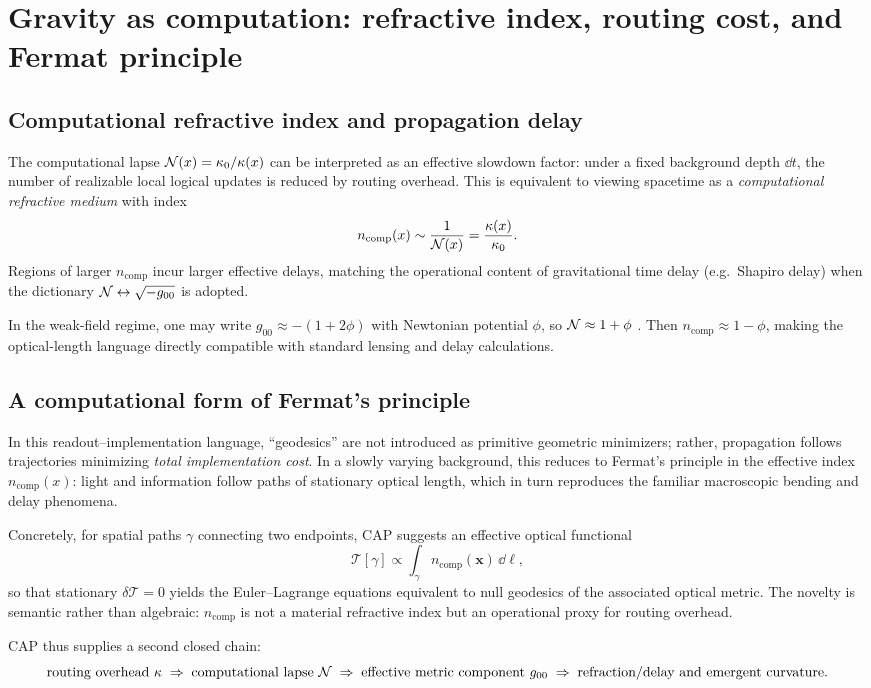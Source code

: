 \section{Gravity as computation: refractive index, routing cost, and Fermat principle}
\label{sec:gravity_as_computation}

\subsection{Computational refractive index and propagation delay}
\label{subsec:comp_index}

The computational lapse $\mathcal{N}(x)=\kappa_0/\kappa(x)$ can be interpreted as an effective slowdown factor: under a fixed background depth $\dd t$, the number of realizable local logical updates is reduced by routing overhead. This is equivalent to viewing spacetime as a \emph{computational refractive medium} with index
\begin{equation}
  n_{\mathrm{comp}}(x) \sim \frac{1}{\mathcal{N}(x)} = \frac{\kappa(x)}{\kappa_0}.
\end{equation}
Regions of larger $n_{\mathrm{comp}}$ incur larger effective delays, matching the operational content of gravitational time delay (e.g.\ Shapiro delay) when the dictionary $\mathcal{N}\leftrightarrow\sqrt{-g_{00}}$ is adopted.

In the weak-field regime, one may write $g_{00}\approx -(1+2\phi)$ with Newtonian potential $\phi$, so $\mathcal{N}\approx 1+\phi$ \cite{Carroll2004,Wald1984}. Then $n_{\mathrm{comp}}\approx 1-\phi$, making the optical-length language directly compatible with standard lensing and delay calculations.

\subsection{A computational form of Fermat's principle}
\label{subsec:fermat}

In this readout--implementation language, ``geodesics'' are not introduced as primitive geometric minimizers; rather, propagation follows trajectories minimizing \emph{total implementation cost}. In a slowly varying background, this reduces to Fermat's principle in the effective index $n_{\mathrm{comp}}(x)$: light and information follow paths of stationary optical length, which in turn reproduces the familiar macroscopic bending and delay phenomena.

Concretely, for spatial paths $\gamma$ connecting two endpoints, CAP suggests an effective optical functional
\begin{equation}
  \mathcal{T}[\gamma] \propto \int_{\gamma} n_{\mathrm{comp}}(\mathbf{x})\, \dd \ell ,
\end{equation}
so that stationary $\delta \mathcal{T}=0$ yields the Euler--Lagrange equations equivalent to null geodesics of the associated optical metric. The novelty is semantic rather than algebraic: $n_{\mathrm{comp}}$ is not a material refractive index but an operational proxy for routing overhead.

CAP thus supplies a second closed chain:
\begin{equation}
  \text{routing overhead } \kappa
  \;\Rightarrow\;
  \text{computational lapse } \mathcal{N}
  \;\Rightarrow\;
  \text{effective metric component } g_{00}
  \;\Rightarrow\;
  \text{refraction/delay and emergent curvature}.
\end{equation}


